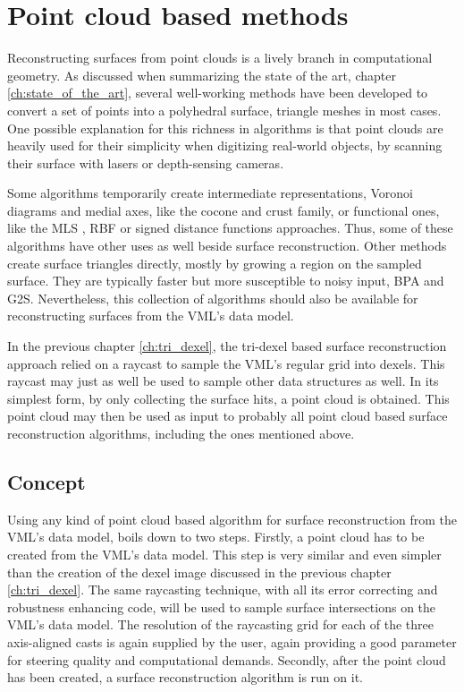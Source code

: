 
\chapter{Point cloud based methods}
\label{ch:point_cloud_based}

Reconstructing surfaces from point clouds is a lively branch in computational geometry.
As discussed when summarizing the state of the art, \cf chapter \ref{ch:state_of_the_art}, several well-working methods have been developed to convert a set of points into a polyhedral surface, \ie triangle meshes in most cases.
One possible explanation for this richness in algorithms is that point clouds are heavily used for their simplicity when digitizing real-world objects, \eg by scanning their surface with lasers or depth-sensing cameras.

Some algorithms temporarily create intermediate representations, \eg Voronoi diagrams and medial axes, like the cocone \cite{cocone, tight_cocone, robust_cocone} and crust \cite{crust, power_crust} family, or functional ones, like the MLS \cite{mls}, RBF \cite{rbf} or signed distance functions \cite{sdf_surface_reconstruction} approaches.
Thus, some of these algorithms have other uses as well beside surface reconstruction.
Other methods create surface triangles directly, mostly by growing a region on the sampled surface.
They are typically faster but more susceptible to noisy input, \eg BPA and G2S.
Nevertheless, this collection of algorithms should also be available for reconstructing surfaces from the VML's data model.

In the previous chapter \ref{ch:tri_dexel}, the tri-dexel based surface reconstruction approach relied on a raycast to sample the VML's regular grid into dexels.
This raycast may just as well be used to sample other data structures as well.
In its simplest form, by only collecting the surface hits, a point cloud is obtained.
This point cloud may then be used as input to probably all point cloud based surface reconstruction algorithms, including the ones mentioned above.


\section{Concept}
\label{sec:point_cloud_concept}

Using any kind of point cloud based algorithm for surface reconstruction from the VML's data model, boils down to two steps.
Firstly, a point cloud has to be created from the VML's data model.
This step is very similar and even simpler than the creation of the dexel image discussed in the previous chapter \ref{ch:tri_dexel}.
The same raycasting technique, with all its error correcting and robustness enhancing code, will be used to sample surface intersections on the VML's data model.
The resolution of the raycasting grid for each of the three axis-aligned casts is again supplied by the user, again providing a good parameter for steering quality and computational demands.
%
Secondly, after the point cloud has been created, a surface reconstruction algorithm is run on it.

